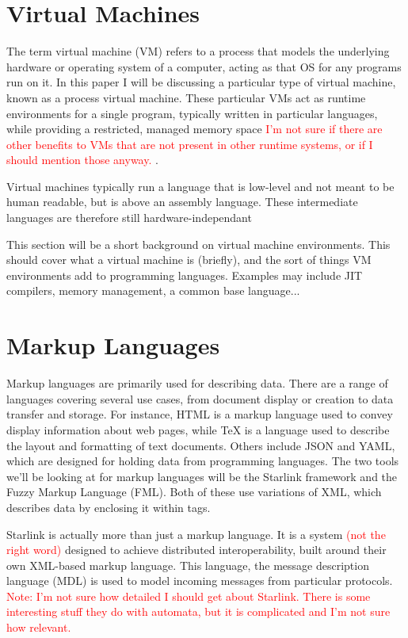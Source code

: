 \documentclass{sig-alternate}
\newcommand{\mycomment}[1]{\textcolor{red}{#1}}
\begin{document}
\section{Virtual Machines}\label{VM}
The term virtual machine (VM) refers to a process that models the underlying hardware or operating system of a computer, acting as that OS for any programs run on it. In this paper I will be discussing a particular type of virtual machine, known as a process virtual machine. These particular VMs act as runtime environments for a single program, typically written in particular languages, while providing a restricted, managed memory space
\mycomment{I'm not sure if there are other benefits to VMs that are not present in other runtime systems, or if I should mention those anyway.}
.

Virtual machines typically run a language that is low-level and not meant to be human readable, but is above an assembly language. These intermediate languages are therefore still hardware-independant



This section will be a short background on virtual machine environments. This should cover what a virtual machine is (briefly), and the sort of things VM environments add to programming languages. Examples may include JIT compilers, memory management, a common base language...


\section{Markup Languages}\label{ML}
Markup languages are primarily used for describing data. There are a range of languages covering several use cases, from document display or creation to data transfer and storage. For instance, HTML is a markup language used to convey display information about web pages, while TeX is a language used to describe the layout and formatting of text documents. Others include JSON and YAML, which are designed for holding data from programming languages. The two tools we'll be looking at for markup languages will be the Starlink framework and the Fuzzy Markup Language (FML). Both of these use variations of XML, which describes data by enclosing it within tags.

Starlink \cite{Bromberg:2011} is actually more than just a markup language. It is a system \mycomment{(not the right word)} designed to achieve distributed interoperability, built around their own XML-based markup language. This language, the message description language (MDL) is used to model incoming messages from particular protocols.
\mycomment{Note: I'm not sure how detailed I should get about Starlink. There is some interesting stuff they do with automata, but it is complicated and I'm not sure how relevant.}
\end{document}
